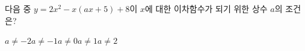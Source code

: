 다음 중 $y=2x^2-x(ax+5)+8$이 $x$에 대한 이차함수가 되기 위한 상수 $a$의 조건은?
\begin{choices32}{$a\neq-2$}{$a\neq-1$}{$a\neq0$}{$a\neq1$}{$a\neq2$}\end{choices32}
